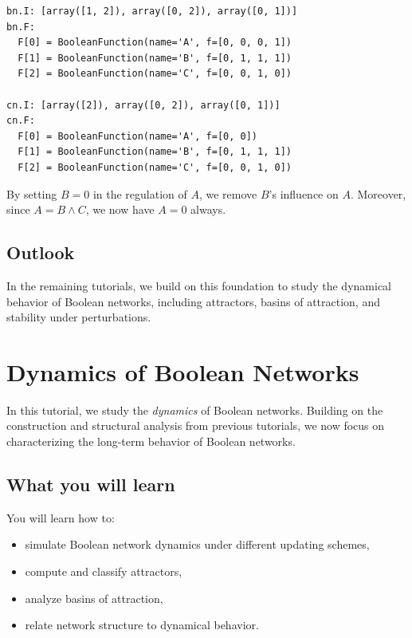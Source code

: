 \documentclass[
]{article}
\providecommand{\tightlist}{%
  \setlength{\itemsep}{0pt}\setlength{\parskip}{0pt}}
\begin{document}
\begin{lstlisting}
bn.I: [array([1, 2]), array([0, 2]), array([0, 1])]
bn.F:
  F[0] = BooleanFunction(name='A', f=[0, 0, 0, 1])
  F[1] = BooleanFunction(name='B', f=[0, 1, 1, 1])
  F[2] = BooleanFunction(name='C', f=[0, 0, 1, 0])

cn.I: [array([2]), array([0, 2]), array([0, 1])]
cn.F:
  F[0] = BooleanFunction(name='A', f=[0, 0])
  F[1] = BooleanFunction(name='B', f=[0, 1, 1, 1])
  F[2] = BooleanFunction(name='C', f=[0, 0, 1, 0])
\end{lstlisting}

By setting \(B=0\) in the regulation of \(A\), we remove \(B\)'s
influence on \(A\). Moreover, since \(A = B \wedge C\), we now have
\(A=0\) always.

\subsection{Outlook}\label{outlook}

In the remaining tutorials, we build on this foundation to study the
dynamical behavior of Boolean networks, including attractors, basins of
attraction, and stability under perturbations.

\section{Dynamics of Boolean
Networks}\label{dynamics-of-boolean-networks}

In this tutorial, we study the \emph{dynamics} of Boolean networks.
Building on the construction and structural analysis from previous
tutorials, we now focus on characterizing the long-term behavior of
Boolean networks.

\subsection{What you will learn}\label{what-you-will-learn-6}

You will learn how to:

\begin{itemize}
\tightlist
\item
  simulate Boolean network dynamics under different updating schemes,
\item
  compute and classify attractors,
\item
  analyze basins of attraction,
\item
  relate network structure to dynamical behavior.
\end{itemize}
\end{document}
